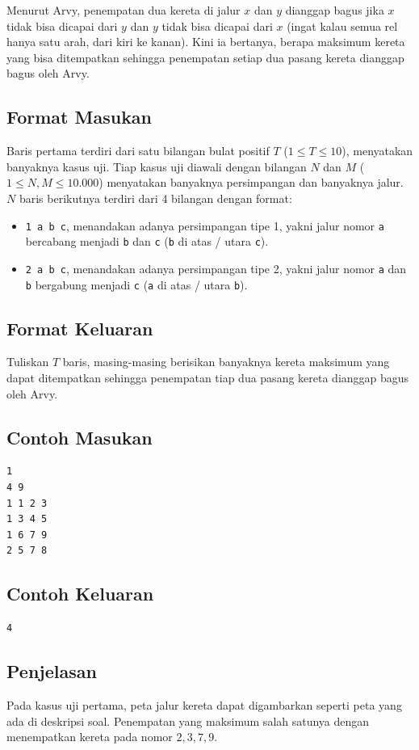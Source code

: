 \documentclass{article}
\begin{document}
Menurut Arvy, penempatan dua kereta di jalur $x$ dan $y$ dianggap bagus jika $x$ tidak bisa dicapai dari $y$ dan $y$ tidak bisa dicapai dari $x$ (ingat kalau semua rel hanya satu arah, dari kiri ke kanan).
Kini ia bertanya, berapa maksimum kereta yang bisa ditempatkan sehingga penempatan setiap dua pasang kereta dianggap bagus oleh Arvy.

\subsection*{Format Masukan}
Baris pertama terdiri dari satu bilangan bulat positif $T$ ($1 \leq T \leq 10$), menyatakan banyaknya kasus uji.
Tiap kasus uji diawali dengan bilangan $N$ dan $M$ ($1 \leq N, M \leq 10.000$) menyatakan banyaknya persimpangan dan banyaknya jalur.
$N$ baris berikutnya terdiri dari 4 bilangan dengan format:
\begin{itemize}
    \setlength{\itemsep}{0pt}
    \item \lstinline{1 a b c}, menandakan adanya persimpangan tipe 1, yakni jalur nomor \lstinline{a} bercabang menjadi \lstinline{b} dan \lstinline{c} (\lstinline{b} di atas / utara \lstinline{c}).
    \item \lstinline{2 a b c}, menandakan adanya persimpangan tipe 2, yakni jalur nomor \lstinline{a} dan \lstinline{b} bergabung menjadi \lstinline{c} (\lstinline{a} di atas / utara \lstinline{b}).
\end{itemize}

\subsection*{Format Keluaran}
Tuliskan $T$ baris, masing-masing berisikan banyaknya kereta maksimum yang dapat ditempatkan sehingga penempatan tiap dua pasang kereta dianggap bagus oleh Arvy.

\pagebreak

\begin{multicols}{2}
\subsection*{Contoh Masukan}
\begin{lstlisting}
1
4 9
1 1 2 3
1 3 4 5
1 6 7 9
2 5 7 8
\end{lstlisting}
\columnbreak
\subsection*{Contoh Keluaran}
\begin{lstlisting}
4
\end{lstlisting}
\vfill
\null
\end{multicols}

\subsection*{Penjelasan}
Pada kasus uji pertama, peta jalur kereta dapat digambarkan seperti peta yang ada di deskripsi soal. Penempatan yang maksimum salah satunya dengan menempatkan kereta pada nomor $2, 3, 7, 9$.
\end{document}
